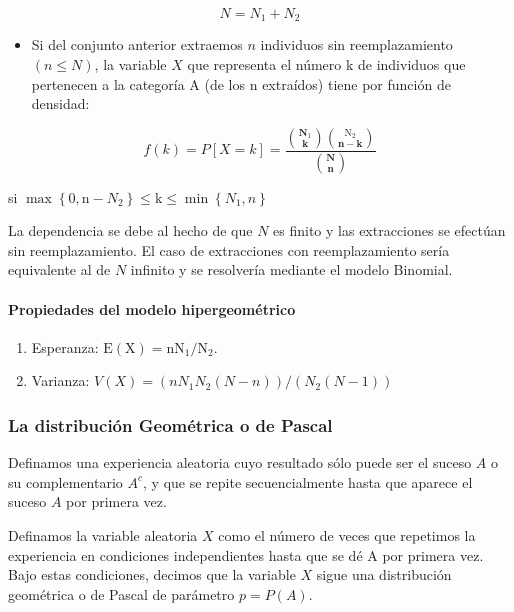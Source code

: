 \documentclass[
]{article}
\providecommand{\tightlist}{%
  \setlength{\itemsep}{0pt}\setlength{\parskip}{0pt}}
\begin{document}
\[
N=N_{1}+N_{2}
\]

\begin{itemize}
\tightlist
\item
  Si del conjunto anterior extraemos \(n\) individuos sin reemplazamiento \((n \leq N)\), la variable \(X\) que representa el número k de individuos que pertenecen a la categoría A (de los n extraídos) tiene por función de densidad:
\end{itemize}

\[
f(k)=P[X=k]=\frac{\binom{\mathbf{N}_{1}}{\mathbf{k}}\binom{\mathrm{N}_{2}}{\mathbf{n}-\mathbf{k}}}{\binom{\mathbf{N}}{\mathbf{n}}}
\]

si \(\operatorname{max}\left\{0, \mathrm{n}-N_{2}\right\} \leq \mathrm{k} \leq \min \left\{N_{1}, n\right\}\)

La dependencia se debe al hecho de que \(N\) es finito y las extracciones se efectúan sin reemplazamiento. El caso de extracciones con reemplazamiento sería equivalente al de \(N\) infinito y se resolvería mediante el modelo Binomial.

\paragraph{Propiedades del modelo hipergeométrico}\label{propiedades-del-modelo-hipergeomuxe9trico}

\begin{enumerate}
\def\labelenumi{\arabic{enumi}.}
\item
  Esperanza: \(\mathrm{E}(\mathrm{X})=\mathrm{n} \mathrm{N}_{1} / \mathrm{N}_{2}\).
\item
  Varianza: \(V(X)=\left(n N_{1} N_{2}(N-n)\right) /\left(N_{2}(N-1)\right)\)
\end{enumerate}

\subsubsection{La distribución Geométrica o de Pascal}\label{la-distribuciuxf3n-geomuxe9trica-o-de-pascal}

Definamos una experiencia aleatoria cuyo resultado sólo puede ser el suceso \(A\) o su complementario \(A^{c}\), y que se repite secuencialmente hasta que aparece el suceso \(A\) por primera vez.

Definamos la variable aleatoria \(X\) como el número de veces que repetimos la experiencia en condiciones independientes hasta que se dé A por primera vez. Bajo estas condiciones, decimos que la variable \(X\) sigue una distribución geométrica o de Pascal de parámetro \(p=P(A)\).
\end{document}
